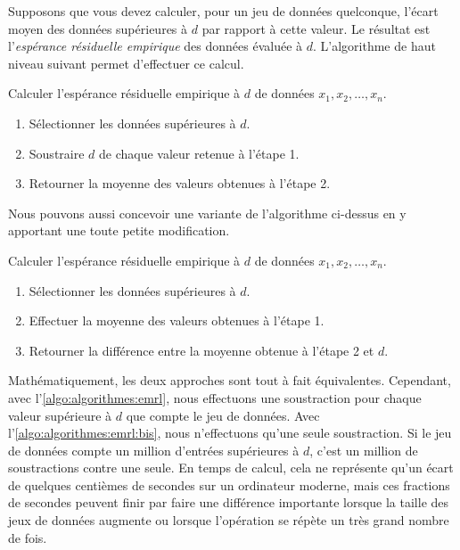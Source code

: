 Supposons que vous devez calculer, pour un jeu de données quelconque,
l'écart moyen des données supérieures à $d$ par rapport à cette
valeur. Le résultat est l'\emph{espérance résiduelle empirique} des
données évaluée à $d$. L'algorithme de haut niveau suivant permet
d'effectuer ce calcul.

\begin{algorithme}
  \label{algo:algorithmes:emrl}
  Calculer l'espérance résiduelle empirique à $d$ de données $x_1, x_2,
  \dots, x_n$.
  \begin{enumerate}
  \item Sélectionner les données supérieures à $d$.
  \item Soustraire $d$ de chaque valeur retenue à l'étape 1.
  \item Retourner la moyenne des valeurs obtenues à l'étape 2.
  \end{enumerate}
\end{algorithme}

Nous pouvons aussi concevoir une variante de l'algorithme ci-dessus en
y apportant une toute petite modification.

\begin{algorithmebis}
  \label{algo:algorithmes:emrl:bis}
  Calculer l'espérance résiduelle empirique à $d$ de données $x_1, x_2,
  \dots, x_n$.
  \begin{enumerate}
  \item Sélectionner les données supérieures à $d$.
  \item Effectuer la moyenne des valeurs obtenues à l'étape 1.
  \item Retourner la différence entre la moyenne obtenue à l'étape 2
    et $d$.
  \end{enumerate}
\end{algorithmebis}

Mathématiquement, les deux approches sont tout à fait équivalentes.
Cependant, avec l'\autoref{algo:algorithmes:emrl}, nous effectuons une
soustraction pour chaque valeur supérieure à $d$ que compte le jeu de
données. Avec l'\autoref{algo:algorithmes:emrl:bis}, nous n'effectuons
qu'une seule soustraction. Si le jeu de données compte un million
d'entrées supérieures à $d$, c'est un million de soustractions contre
une seule. En temps de calcul, cela ne représente qu'un écart de
quelques centièmes de secondes sur un ordinateur moderne, mais ces
fractions de secondes peuvent finir par faire une différence
importante lorsque la taille des jeux de données augmente ou lorsque
l'opération se répète un très grand nombre de fois.

